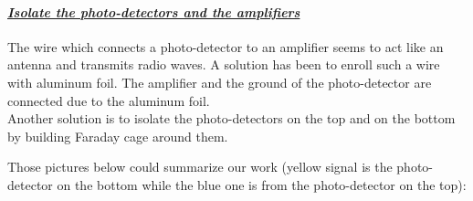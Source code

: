 \documentclass[a4paper, 11pt]{report}%
\begin{document}
  \paragraph{\underline{\emph{Isolate the photo-detectors and the amplifiers}}}
  
  The wire which connects a photo-detector to an amplifier seems to act like an antenna and transmits radio waves. A solution has been 
  to enroll such a wire with aluminum foil. The amplifier and the ground of the photo-detector are connected due to the aluminum foil.\\
  Another solution is to isolate the photo-detectors on the top and on the bottom by building Faraday cage around them.
    
  Those pictures below could summarize our work (yellow signal is the photo-detector on the bottom while the blue one is from the 
  photo-detector on the top):
  
  \newpage
  
\end{document}
